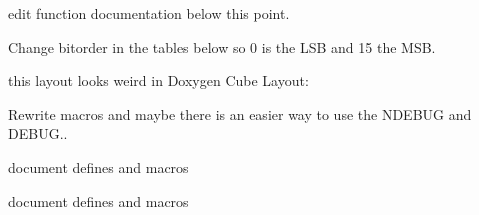 
\begin{DoxyRefList}
\item[\label{todo__todo000006}%
\hypertarget{todo__todo000006}{}%
global\+Scope$>$ Member \hyperlink{_led_cube_8c_a6e1bec5e1376511c7b79d3f217af65a8}{\+\_\+helper\+Print\+Byte} (const uint8\+\_\+t \+\_\+b)]edit function documentation below this point.  
\item[\label{todo__todo000005}%
\hypertarget{todo__todo000005}{}%
global\+Scope$>$ Member \hyperlink{_led_driver_8h_a3ed82ed3cce7de15bc8e7675c776e1d9}{\+\_\+\+L\+E\+D\+\_\+\+D\+R\+I\+V\+E\+R\+\_\+\+Reorder\+Led\+Data} (led\+Data)]Change bitorder in the tables below so 0 is the L\+S\+B and 15 the M\+S\+B.  
\item[\label{todo__todo000001}%
\hypertarget{todo__todo000001}{}%
global\+Scope$>$ Member \hyperlink{_layer_control_8h_a816c836589db27dcd3632fade8f0f6f3}{L\+C\+\_\+\+E\+N\+A\+B\+L\+E\+\_\+\+S\+E\+L\+F\+\_\+\+T\+E\+S\+T\+\_\+\+N\+O} ]this layout looks weird in Doxygen Cube Layout\+: 
\item[\label{todo__todo000007}%
\hypertarget{todo__todo000007}{}%
File \hyperlink{_my_assert_8h}{My\+Assert.h} ]Rewrite macros and maybe there is an easier way to use the N\+D\+E\+B\+U\+G and D\+E\+B\+U\+G..  
\item[\label{todo__todo000002}%
\hypertarget{todo__todo000002}{}%
global\+Scope$>$ Member \hyperlink{_layer_control_8h_a06153a40508dfb2456f40e344e145c08}{N\+\_\+\+P\+A\+N\+E\+L\+C\+O\+N\+T\+R\+O\+L\+S} ]document defines and macros  
\item[\label{todo__todo000004}%
\hypertarget{todo__todo000004}{}%
global\+Scope$>$ Member \hyperlink{_led_driver_8h_a97476fd466a0045342316c7a2a0c6ccb}{S\+P\+I1\+\_\+\+P\+P\+R\+E} ]document defines and macros 
\end{DoxyRefList}